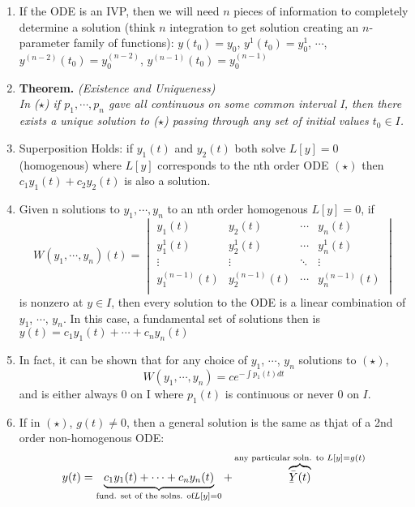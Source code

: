 \begin{enumerate}[label=\protect\circled{\Roman*}]
	\item If the ODE is an IVP, then we will need $n$ pieces of information to completely determine a solution (think $n$ integration to get solution creating an $n$-parameter family of functions): $y(t_0) = y_0$, $y^1(t_0) = y_0^1$, $\cdots$, $y^{(n-2)}(t_0) = y_0^{(n-2)}$, $y^{(n-1)}(t_0) = y_0^{(n-1)}$
	\item \textbf{Theorem.}	\textit{(Existence and Uniqueness)\\
		In ($\star$) if $p_1, \cdots, p_n$ gave all continuous on some common interval I, then there exists a unique solution to ($\star$) passing through any set of initial values $t_0 \in I$.}
	\item Superposition Holds: if $y_1(t)$ and $y_2(t)$ both solve $L[y] = 0$ (homogenous) where $L[y]$ corresponds to the nth order ODE $(\star)$ then $c_1y_1(t) + c_2y_2(t)$ is also a solution.
	\item Given n solutions to $y_1, \cdots, y_n$ to an nth order homogenous $L[y] = 0$, if 
	\begin{equation*}
		W(y_1, \cdots, y_n) (t) = 
		\begin{vmatrix}
			y_1(t) & y_2(t) & \cdots & y_n(t)\\
			y_1^1(t) & y_2^1(t) & \cdots & y_n^1(t)\\
			\vdots & \vdots & \ddots & \vdots\\
			y_1^{(n-1)}(t) & y_2^{(n-1)}(t) & \cdots & y_n^{(n-1)}(t)\\
		\end{vmatrix}
	\end{equation*}
	is nonzero at $y \in I$, then every solution to the ODE is a linear combination of $y_1$, $\cdots$, $y_n$. In this case, a fundamental set of solutions then is $y(t) = c_1y_1(t) + \cdots + c_ny_n(t)$
	\item In fact, it can be shown that for any choice of $y_1$, $\cdots$, $y_n$ solutions to $(\star)$, 
	\begin{equation*}
		W(y_1, \cdots, y_n) = ce^{-\int p_1(t)dt}
	\end{equation*}
	and is either always 0 on I where $p_1(t)$ is continuous or never 0 on $I$.
	\item If in $(\star)$, $g(t) \neq 0$, then a general solution is the same as thjat of a 2nd order non-homogenous ODE:
	\begin{equation*}
		y(t) = \underbrace{c_1y_1(t) + \cdots + c_ny_n(t)}_{\text{fund. set of the solns. of} L[y] = 0} + \overbrace{\Ylines(t)}^{\text{any particular soln. to } L[y] = g(t)}
	\end{equation*} 
\end{enumerate}